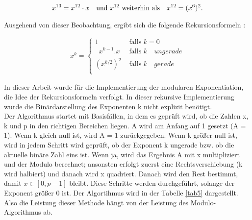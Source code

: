 \begin{align*}
    x^{13} = x^{12} \cdot x \quad \text{und \( x^{12}\) weiterhin als} \quad x^{12} = (x^{6})^2.
\end{align*}

Ausgehend von dieser Beobachtung, ergibt sich die folgende Rekursionsformeln \cite{lang}:

\begin{ceqn}
\begin{align*}
     x^k = \begin{cases}
     1    & \text{ falls } k = 0 \\
    \;\;x^{k-1}.x  & \text{ falls } k \quad ungerade \\
    (x^{k/2})^2     & \text{ falls } k \quad gerade \\
    \end{cases}
\end{align*}
\end{ceqn}

In dieser Arbeit wurde für die Implementierung der modularen Exponentiation, die Idee der Rekursionsformeln verfolgt.
In dieser rekursive Implementierung wurde die Binärdarstellung des Exponenten k nicht explizit benötigt.\\

Der Algorithmus startet mit Basisfällen, in dem es geprüft wird, ob die Zahlen x, k und p in den richtigen Bereichen liegen. 
A wird am Anfang auf 1 gesetzt (A = 1). Wenn k gleich null ist, wird A = 1 zurückgegeben. 
Wenn k größer null ist, wird in jedem Schritt wird geprüft, ob der Exponent k ungerade bzw. ob die aktuelle binäre Zahl eins ist. 
Wenn ja, wird das Ergebnis A mit x multipliziert und der Modulo berechnet; ansonsten erfolgt zuerst eine
Rechtsverschiebung (k wird halbiert) und danach wird x quadriert. Danach wird den Rest bestimmt, damit $x \in [0, p-1] $ bleibt.
Diese Schritte werden durchgeführt, solange der Exponent größer 0 ist. Der Algortihmus wird in der Tabelle \ref{tab5} dargestellt.
Also die Leistung dieser Methode hängt von der Leistung des Modulo-Algorithmus ab.

